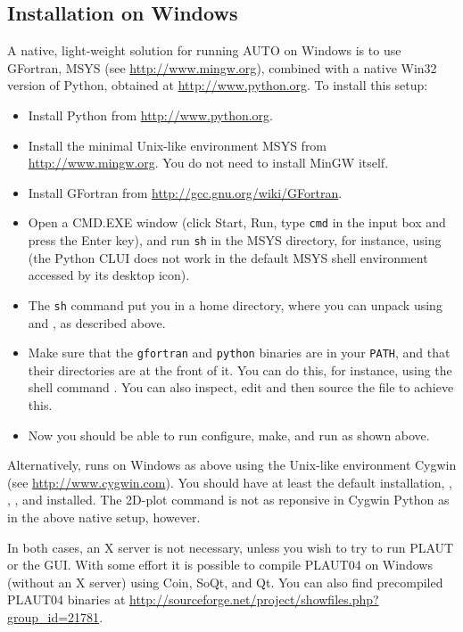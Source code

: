 \documentclass[12pt]{report}
\begin{document}
\subsection{Installation on Windows}
A native, light-weight solution for running AUTO on Windows is
to use GFortran, MSYS (see \url{http://www.mingw.org}),
combined with a native Win32 version of Python,
obtained at \url{http://www.python.org}. To install this setup:
\begin{itemize}
\item
Install Python from \url{http://www.python.org}.
\item
Install the minimal Unix-like environment MSYS from
\url{http://www.mingw.org}. You do not need to install MinGW
itself.
\item
Install GFortran from \url{http://gcc.gnu.org/wiki/GFortran}.
\item
Open a CMD.EXE window (click Start, Run, type {\tt cmd}
in the input box and press the Enter key), and run {\tt sh} in the
MSYS directory, for instance, using
(the Python CLUI does not work in the default MSYS shell environment
 accessed by its desktop icon).
\item
The {\tt sh} command put you in a home directory, where you can unpack
\AUTO using  and , as described above.
\item
Make sure that the {\tt gfortran} and {\tt python} binaries
are in your {\tt PATH}, and that their directories are at the front of it.
You can do this, for instance, using the shell command
.
You can also inspect, edit and then source the file
 to achieve this.
\item
Now you should be able to run configure, make, and run \AUTO as
shown above.
\end{itemize}

Alternatively, \AUTO runs on Windows as above using the Unix-like
environment Cygwin (see \url{http://www.cygwin.com}). You should have
at least the default installation, , ,
, and  installed. The 2D-plot command
is not as reponsive in Cygwin Python as in the above native setup, however.

In both cases, an X server is not necessary, unless you wish to try to run
PLAUT or the GUI. With some effort it is possible to compile PLAUT04
on Windows (without an X server) using Coin, SoQt, and Qt. You can
also find precompiled PLAUT04 binaries at
\url{http://sourceforge.net/project/showfiles.php?group_id=21781}.
\end{document}
